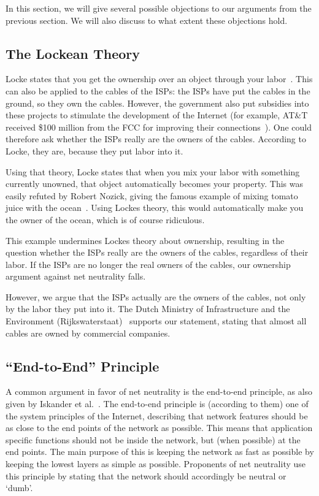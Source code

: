 
In this section, we will give several possible objections to our arguments from the previous section.
We will also discuss to what extent these objections hold.

\subsection{The Lockean Theory}
Locke states that you get the ownership over an object through your labor~\cite{tuckness2012locke}.
This can also be applied to the cables of the \acp{ISP}: the \acp{ISP} have put the cables in the ground, so they own the cables.
However, the government also put subsidies into these projects to stimulate the development of the Internet (for example, AT\&T received \$100 million from the FCC for improving their connections~\cite{bode2013att}).
One could therefore ask whether the \acp{ISP} really are the owners of the cables.
According to Locke, they are, because they put labor into it.

Using that theory, Locke states that when you mix your labor with something currently unowned, that object automatically becomes your property.
This was easily refuted by Robert Nozick, giving the famous example of mixing tomato juice with the ocean~\cite{tuckness2012locke}.
Using Lockes theory, this would automatically make you the owner of the ocean, which is of course ridiculous.

This example undermines Lockes theory about ownership, resulting in the question whether the \acp{ISP} really are the owners of the cables, regardless of their labor.
If the \acp{ISP} are no longer the real owners of the cables, our ownership argument against net neutrality falls.

However, we argue that the \acp{ISP} actually are the owners of the cables, not only by the labor they put into it.
The Dutch Ministry of Infrastructure and the Environment (Rijkswaterstaat)~\cite{rws2014kabels} supports our statement, stating that almost all cables are owned by commercial companies.

\subsection{``End-to-End'' Principle}
A common argument in favor of net neutrality is the end-to-end principle, as also given by Iskander et al.~\cite{iskander2010end}.
The end-to-end principle is (according to them) one of the system principles of the Internet, describing that network features should be as close to the end points of the network as possible.
This means that application specific functions should not be inside the network, but (when possible) at the end points.
The main purpose of this is keeping the network as fast as possible by keeping the lowest layers as simple as possible.
Proponents of net neutrality use this principle by stating that the network should accordingly be neutral or `dumb'.

